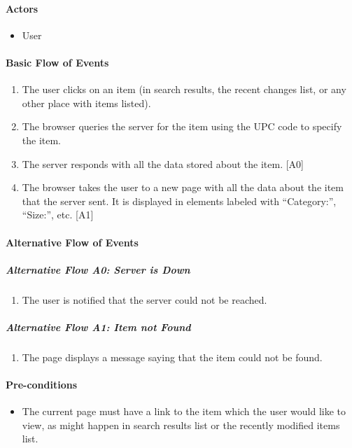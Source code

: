 \documentclass{article}
\begin{document}
\paragraph{Actors}
\begin{itemize}
\item User
\end{itemize}

\paragraph{Basic Flow of Events}
\begin{enumerate}
\item The user clicks on an item (in search results, the recent changes list, or any other place with items listed).
\item The browser queries the server for the item using the UPC code to specify the item.
\item The server responds with all the data stored about the item. [A0]
\item The browser takes the user to a new page with all the data about the item that the server sent.  It is displayed in elements labeled with “Category:”, “Size:”, etc. [A1]
\end{enumerate}

\paragraph{Alternative Flow of Events}

\subparagraph{Alternative Flow A0: Server is Down}
\begin{enumerate}
\item The user is notified that the server could not be reached.
\end{enumerate}

\subparagraph{Alternative Flow A1: Item not Found}
\begin{enumerate}
\item The page displays a message saying that the item could not be found.
\end{enumerate}

\paragraph{Pre-conditions}
\begin{itemize}
\item The current page must have a link to the item which the user would like to view, as might happen in search results list or the recently modified items list.
\end{itemize}
\end{document}
